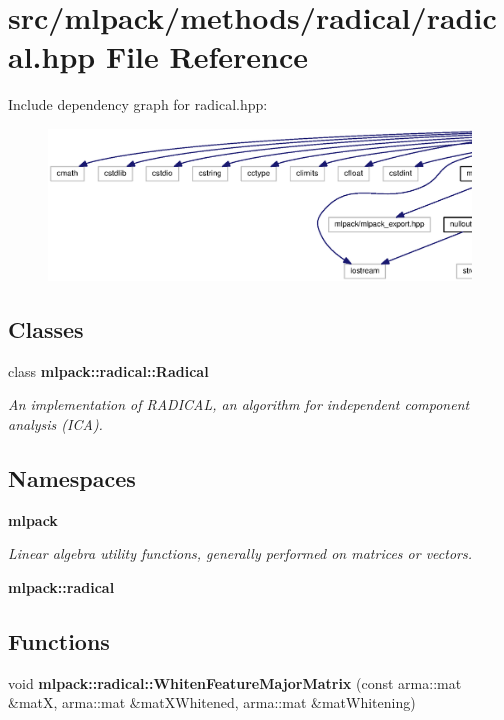 \section{src/mlpack/methods/radical/radical.hpp File Reference}
\label{radical_8hpp}
Include dependency graph for radical.\+hpp\+:
\nopagebreak
\begin{figure}[H]
\begin{center}
\leavevmode
\includegraphics[width=350pt]{radical_8hpp__incl}
\end{center}
\end{figure}
\subsection*{Classes}
\begin{DoxyCompactItemize}
\item 
class {\bf mlpack\+::radical\+::\+Radical}
\begin{DoxyCompactList}\small\item\em An implementation of R\+A\+D\+I\+C\+AL, an algorithm for independent component analysis (I\+CA). \end{DoxyCompactList}\end{DoxyCompactItemize}
\subsection*{Namespaces}
\begin{DoxyCompactItemize}
\item 
 {\bf mlpack}
\begin{DoxyCompactList}\small\item\em Linear algebra utility functions, generally performed on matrices or vectors. \end{DoxyCompactList}\item 
 {\bf mlpack\+::radical}
\end{DoxyCompactItemize}
\subsection*{Functions}
\begin{DoxyCompactItemize}
\item 
void {\bf mlpack\+::radical\+::\+Whiten\+Feature\+Major\+Matrix} (const arma\+::mat \&matX, arma\+::mat \&mat\+X\+Whitened, arma\+::mat \&mat\+Whitening)
\end{DoxyCompactItemize}


